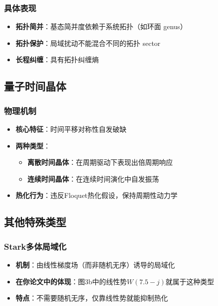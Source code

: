 \documentclass[11pt,a4paper]{article}
\begin{document}
\subsubsection{具体表现}
\begin{itemize}
    \item \textbf{拓扑简并}：基态简并度依赖于系统拓扑（如环面 genus）
    \item \textbf{拓扑保护}：局域扰动不能混合不同的拓扑 sector
    \item \textbf{长程纠缠}：具有拓扑纠缠熵
\end{itemize}

\subsection{量子时间晶体}

\subsubsection{物理机制}
\begin{itemize}
    \item \textbf{核心特征}：时间平移对称性自发破缺
    \item \textbf{两种类型}：
    \begin{itemize}
        \item \textbf{离散时间晶体}：在周期驱动下表现出倍周期响应
        \item \textbf{连续时间晶体}：在连续时间演化中自发振荡
    \end{itemize}
    \item \textbf{热化行为}：违反Floquet热化假设，保持周期性动力学
\end{itemize}

\subsection{其他特殊类型}

\subsubsection{Stark多体局域化}
\begin{itemize}
    \item \textbf{机制}：由线性梯度场（而非随机无序）诱导的局域化
    \item \textbf{在你论文中的体现}：图3b中的线性势$W(7.5-j)$就属于这种类型
    \item \textbf{特点}：不需要随机无序，仅靠线性势就能抑制热化
\end{itemize}
\end{document}
